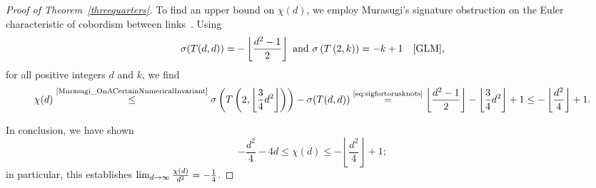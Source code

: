 \documentclass[10pt,a4paper]{article}
\theoremstyle{definition}
\numberwithin{equation}{section}
\renewcommand*{\to}{\mathchoice{\longrightarrow}{\rightarrow}{\rightarrow}{\rightarrow}}
\begin{document}
\begin{proof}[Proof of Theorem~\ref{threequarters}]
To find an upper bound on $\chi(d)$, we employ Murasugi's signature obstruction on the Euler characteristic of cobordism between links~\cite{Murasugi_OnACertainNumericalInvariant}. Using
\begin{equation}\label{eq:sigfortorusknots}
\sigma(T(d,d))=-\left\lfloor\frac{d^2-1}{2}\right\rfloor\text{ and }\sigma\left(T\left(2,k\right)\right)=-k+1\quad\text{\cite[Theorem~5.2]{GLM}},
\end{equation}
for all positive integers $d$ and $k$, we find
\[
\chi(d)\overset{\text{\cite{Murasugi_OnACertainNumericalInvariant}}}{\leq}
\sigma\left(T\left(2,\left\lfloor\frac{3}{4}d^2\right\rfloor\right)\right)-\sigma(T(d,d))\overset{\text{\eqref{eq:sigfortorusknots}}}{=}\left\lfloor\frac{d^2-1}{2}\right\rfloor-\left\lfloor\frac{3}{4}d^2\right\rfloor+1\leq -\left\lfloor\frac{d^2}{4}\right\rfloor+1.
\]

In conclusion, we have shown
\begin{equation}\label{eq:boundsonchi(d)}
-\frac{d^2}{4}-4d\leq\chi(d)\leq-\left\lfloor\frac{d^2}{4}\right\rfloor+1;
\end{equation}
in particular, this establishes $\lim_{d \to \infty} \frac{\chi(d)}{d^2}=-\frac{1}{4}$.
\end{proof}
\end{document}
